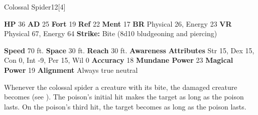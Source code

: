   \begin{monsubsection}{Colossal Spider}{12}[4]
    \vspace{-1em}\vspace{-1em}
    \vspace{0em}

    
    

    \begin{spellcontent}
      \begin{spelltargetinginfo}
        \pari \textbf{HP} 36 \monsep
          \textbf{AD} 25 \monsep
          \textbf{Fort} 19 \monsep
          \textbf{Ref} 22 \monsep
          \textbf{Ment} 17
        \pari \textbf{BR} Physical 26, Energy 23 \monsep
        \textbf{VR} Physical 67, Energy 64
        \pari \textbf{Strike:}
            Bite  (8d10 bludgeoning and piercing)
      \end{spelltargetinginfo}
    \end{spellcontent}
    \begin{monsterfooter}
      \pari \textbf{Speed} 70 ft. \monsep
        \textbf{Space} 30 ft. \monsep
        \textbf{Reach} 30 ft.
      \pari \textbf{Awareness} 
      \pari \textbf{Attributes}
        Str 15, Dex 15,
        Con 0, Int -9,
        Per 15, Wil 0
      \pari \textbf{Accuracy} 18 \monsep
        \textbf{Mundane Power} 23 \monsep
      \textbf{Magical Power} 19
      \pari \textbf{Alignment} Always true neutral
    \end{monsterfooter}
  \end{monsubsection}
        Whenever the colossal spider  a creature with its bite,
          the damaged creature becomes  (see ).
        The poison's initial hit makes the target  as long as the poison lasts.
        On the poison's third hit, the target becomes  as long as the poison lasts.
  
